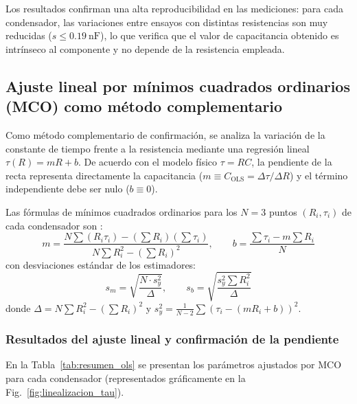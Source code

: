 Los resultados confirman una alta reproducibilidad en las mediciones: para cada condensador, las variaciones entre ensayos con distintas resistencias son muy reducidas ($s \le \qty{0,19}{\nano\farad}$), lo que verifica que el valor de capacitancia obtenido es intrínseco al componente y no depende de la resistencia empleada.

\subsection{Ajuste lineal por mínimos cuadrados ordinarios (MCO) como método complementario}

Como método complementario de confirmación, se analiza la variación de la constante de tiempo frente a la resistencia mediante una regresión lineal $\tau(R) = m R + b$. De acuerdo con el modelo físico $\tau = RC$, la pendiente de la recta representa directamente la capacitancia ($m \equiv C_{\text{OLS}} = \Delta \tau / \Delta R$) y el término independiente debe ser nulo ($b \equiv 0$).

Las fórmulas de mínimos cuadrados ordinarios para los $N = 3$ puntos $(R_i, \tau_i)$ de cada condensador son \cite{taylor}:
\begin{equation}
    m = \frac{N \sum (R_i \tau_i) - (\sum R_i)(\sum \tau_i)}{N \sum R_i^2 - (\sum R_i)^2}, \qquad b = \frac{\sum \tau_i - m \sum R_i}{N}
    \label{eq:formulas_mco}
\end{equation}
con desviaciones estándar de los estimadores:
\begin{equation}
    s_m = \sqrt{\frac{N \cdot s_y^2}{\Delta}}, \qquad s_b = \sqrt{\frac{s_y^2 \sum R_i^2}{\Delta}}
\end{equation}
donde $\Delta = N \sum R_i^2 - (\sum R_i)^2$ y $s_y^2 = \frac{1}{N-2} \sum (\tau_i - (m R_i + b))^2$.

\subsubsection{Resultados del ajuste lineal y confirmación de la pendiente}

En la Tabla~\ref{tab:resumen_ols} se presentan los parámetros ajustados por MCO para cada condensador (representados gráficamente en la Fig.~\ref{fig:linealizacion_tau}).

